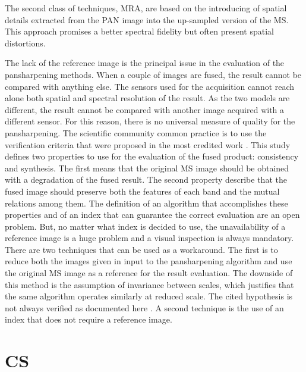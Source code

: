 \documentclass[12pt]{report}
\begin{document}
The second class of techniques, MRA, are based on the introducing of spatial details extracted from the PAN image into the up-sampled version of the MS. This approach promises a better spectral fidelity but often present spatial distortions.

The lack of the reference image is the principal issue in the evaluation of the pansharpening methods.
When a couple of images are fused, the result cannot be compared with anything else. The sensors used for the acquisition cannot reach alone both spatial and spectral resolution of the result. As the two models are different, the result cannot be compared with another image acquired with a different sensor.
For this reason, there is no universal measure of quality for the pansharpening. The scientific community common practice is to use the verification criteria that were proposed in the most credited work \cite{towaldetal}. This study defines two properties to use for the evaluation of the fused product: consistency and synthesis. The first means that the original MS image should be obtained with a degradation of the fused result.
The second property describe that the fused image should preserve both the features of each band and the mutual relations among them. The definition of an algorithm that accomplishes these properties and of an index that can guarantee the correct evaluation are an open problem. But, no matter what index is decided to use, the unavailability of a reference image is a huge problem and a visual inspection is always mandatory. There are two techniques that can be used as a workaround. The first is to reduce both the images given in input to the pansharpening algorithm and use the original MS image as a reference for the result evaluation. The downside of this method is the assumption of invariance between scales, which justifies that the same algorithm operates similarly at reduced scale. The cited hypothesis  is not always verified as documented here \cite{scaleinvariance1} \cite{towaldetal}. A second technique is the use of an index that does not require a reference image.


\section{CS}
\end{document}
